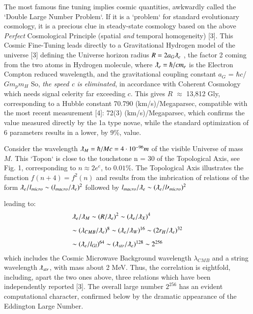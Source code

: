 \documentclass[twoside,draft]{article}
\begin{document}
\begin{sloppypar}
{The most famous fine tuning implies cosmic quantities, awkwardly called the `Double
Large Number Problem`. If it is a `problem` for standard evolutionary cosmology, it is a precious
clue in steady-state cosmology based on the above \textit{Perfect} Cosmological Principle (spatial \textit{and} temporal homogeneity) [3].
This Cosmic Fine-Tuning leads directly to a Gravitational Hydrogen model of the universe [3]
defining the Universe horizon radius $R = 2a_{G} \lambdabar_{e}$ , the factor 2 coming from the two atoms in
Hydrogen molecule, where 
$\lambdabar_{e} = \hbar/cm_{e}$
is the Electron Compton reduced wavelength, and the
gravitational coupling constant 
$a_{G}$ = $\hbar$$c$/$G$$m_{p}$$m_{H}$
So, \textit{the speed c is eliminated}, in accordance with
Coherent Cosmology which needs signal celerity far exceeding $c$. This gives $R$ $\approx$ 13,812 Gly, corresponding to a Hubble constant 70.790 (km/s)/Megaparsec, compatible with the
most recent measurement [4]: 72(3) (km/s)/Megaparsec, which confirms the value measured
directly by the 1a type novae, while the standard optimization of 6 parameters results in a lower, by 9\%,
value.

Consider the wavelength $\lambdabar_{M} = \hbar /Mc = 4 \cdot 10^{-96} m$ of the visible Universe of mass $M$. This `Topon` is close to the touchstone n = 30 of the Topological Axis, see Fig. 1,
corresponding to $n \approx 2e^{e}$, to $0.01\%$. The Topological Axis illustrates the function $f(n + 4) = f^{2}(n)$
and results from the imbrication of relations of the form 
$
\lambdabar_{e} /l_{micro} \sim (l_{macro} /\lambdabar_{e})^{2}
$
followed by 
$
l_{macro} /\lambdabar_{e} \sim (\lambdabar_{e} /l\prime_{micro} )^{2}
$

leading to:
$$
\begin{array}{ll}
%
\displaystyle
\lambdabar_{e}/\lambdabar_{M} \sim (R/\lambdabar_{e})^{2} \sim (\lambdabar_{e}/ \lambdabar_{X})^{4}\\[+8pt]  %
\sim (\lambda_{CMB}/ \lambdabar_{e})^{8} \sim (\lambdabar_{e}/\lambdabar_{W})^{16} \sim (2r_{H} /\lambdabar_{e})^{32}\\[+8pt] %
\sim (\lambdabar_{e}/ l_{Gl} )^{64} \sim (\lambdabar_{str} /\lambdabar_{e} )^{128} \sim 2^{256}\\ %
\end{array}
$$
which includes the Cosmic Microwave Background wavelength $\lambda_{CMB}$ and a string wavelength $\lambdabar_{str}$, with mass about 2 MeV.  Thus, the correlation is eightfold,
including, apart the two ones above, three relations which have been independently reported [3].
The overall large number $2^{256}$ has an evident computational character, confirmed below by the
dramatic appearance of the Eddington Large Number.

}
\end{sloppypar}
\end{document}
